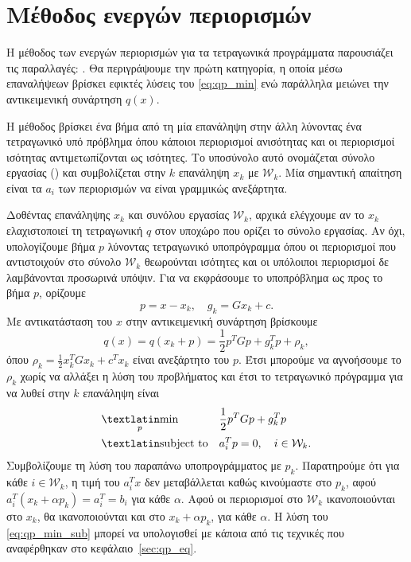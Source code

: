 \section{Μέθοδος ενεργών περιορισμών}
Η μέθοδος των ενεργών περιορισμών για τα τετραγωνικά προγράμματα παρουσιάζει τις
παραλλαγές: . Θα περιγράψουμε την πρώτη κατηγορία,
η οποία μέσω επαναλήψεων βρίσκει εφικτές λύσεις του \eqref{eq:qp_min} ενώ παράλληλα μειώνει την
αντικειμενική συνάρτηση $q(x)$.

Η μέθοδος βρίσκει ένα βήμα από τη μία επανάληψη στην άλλη λύνοντας ένα
τετραγωνικό υπό πρόβλημα όπου κάποιοι περιορισμοί ανισότητας και οι περιορισμοί
ισότητας αντιμετωπίζονται ως ισότητες. Το υποσύνολο αυτό ονομάζεται σύνολο
εργασίας () και συμβολίζεται στην $k$ επανάληψη $x_k$ με $\mathcal{W}_k$. Μία
σημαντική απαίτηση είναι τα $a_i$ των περιορισμών να είναι γραμμικώς ανεξάρτητα.

Δοθέντας επανάληψης $x_k$ και συνόλου εργασίας $\mathcal{W}_k$, αρχικά ελέγχουμε
αν το $x_k$ ελαχιστοποιεί τη τετραγωνική $q$ στον υποχώρο που ορίζει το σύνολο
εργασίας. Αν όχι, υπολογίζουμε βήμα $p$ λύνοντας τετραγωνικό υποπρόγραμμα όπου
οι περιορισμοί που αντιστοιχούν στο σύνολο $\mathcal{W}_k$ θεωρούνται ισότητες
και οι υπόλοιποι περιορισμοί δε λαμβάνονται προσωρινά υπόψιν. Για να εκφράσουμε
το υποπρόβλημα ως προς το βήμα $p$, ορίζουμε
\begin{equation*}
    p = x - x_k, \quad g_k= Gx_k + c.
\end{equation*}
Με αντικατάσταση του $x$ στην αντικειμενική συνάρτηση βρίσκουμε
\begin{equation*}
    q(x) = q(x_k + p) = \frac{1}{2}p^TGp + g_k^Tp + \rho_k,
\end{equation*}
όπου $\rho_k = \frac{1}{2} x^T_kGx_k + c^Tx_k$ είναι ανεξάρτητο του $p$. Έτσι
μπορούμε να αγνοήσουμε το $\rho_k$ χωρίς να αλλάξει η λύση του προβλήματος και
έτσι το τετραγωνικό πρόγραμμα για να λυθεί στην $k$ επανάληψη είναι
\begin{equation}\label{eq:qp_min_sub}
    \begin{aligned}
        & \underset{p}{\text{\tl{min}}}
        & & \frac{1}{2}p^TGp + g^T_kp \\
        & \text{\tl{subject to}}
        & & a^T_ip = 0, \quad i \in \mathcal{W}_k.
    \end{aligned}
\end{equation}
Συμβολίζουμε τη λύση του παραπάνω υποπρογράμματος με $p_k$. Παρατηρούμε ότι για
κάθε $i \in \mathcal{W}_k$, η τιμή του $a_i^Tx$ δεν μεταβάλλεται καθώς
κινούμαστε στο $p_k$, αφού $a_i^T(x_k + \alpha p_k) = a_i^T = b_i$ για κάθε
$\alpha$. Αφού οι περιορισμοί στο $\mathcal{W}_k$ ικανοποιούνται στο $x_k$, θα
ικανοποιούνται και στο $x_k + \alpha p_k$, για κάθε $\alpha$. Η λύση του
\eqref{eq:qp_min_sub} μπορεί να υπολογισθεί με κάποια από τις τεχνικές που
αναφέρθηκαν στο κεφάλαιο~\ref{sec:qp_eq}.

